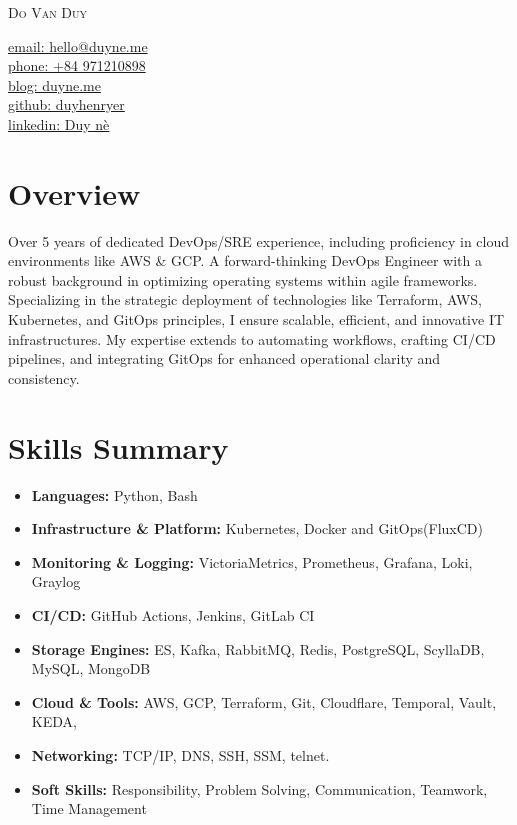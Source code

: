 \documentclass[11pt, a4paper]{article}
\begin{document}
\noindent
\begin{minipage}[t]{0.60\textwidth}
    \Huge\scshape Do Van Duy
\end{minipage}%
\begin{minipage}[t]{0.40\textwidth}
    \raggedleft
    \normalsize
    \href{mailto:hello@duyne.me}{email: hello@duyne.me}\\
    \href{tel:+84971210898}{phone: +84 971210898}\\
    \href{https://duyne.me}{blog: duyne.me}\\
    \href{https://github.com/duyhenryer}{github: duyhenryer}\\
    \href{https://linkedin.com/in/duyne}{linkedin: Duy nè}
\end{minipage}
\vspace{0.75em}

\section{Overview}
\begingroup
{}
Over 5 years of dedicated DevOps/SRE experience, including proficiency in cloud environments like AWS \& GCP. A forward-thinking DevOps Engineer with a robust background in optimizing operating systems within agile frameworks. Specializing in the strategic deployment of technologies like Terraform, AWS, Kubernetes, and GitOps principles, I ensure scalable, efficient, and innovative IT infrastructures. My expertise extends to automating workflows, crafting CI/CD pipelines, and integrating GitOps for enhanced operational clarity and consistency.
\endgroup

\section{Skills Summary}
\begin{itemize}[leftmargin=*, label={}]
    \item \textbf{Languages:} Python, Bash
    \item \textbf{Infrastructure \& Platform:} Kubernetes, Docker and GitOps(FluxCD)
    \item \textbf{Monitoring \& Logging:} VictoriaMetrics, Prometheus, Grafana, Loki, Graylog
    \item \textbf{CI/CD:} GitHub Actions, Jenkins, GitLab CI
    \item \textbf{Storage Engines:} ES, Kafka, RabbitMQ, Redis, PostgreSQL, ScyllaDB, MySQL, MongoDB
    \item \textbf{Cloud \& Tools:} AWS, GCP, Terraform, Git, Cloudflare, Temporal, Vault, KEDA,
    \item \textbf{Networking:} TCP/IP, DNS, SSH, SSM, telnet.
    \item \textbf{Soft Skills:} Responsibility, Problem Solving, Communication, Teamwork, Time Management    
\end{itemize}
\end{document}
